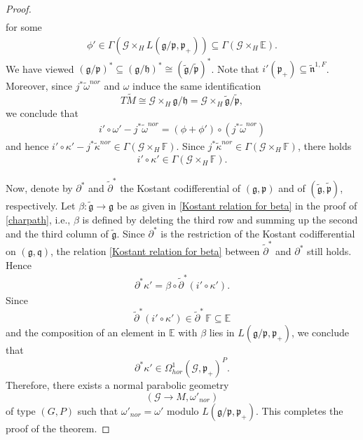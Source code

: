 \documentclass[11pt]{amsart}
\begin{document}
\begin{proof}
\begin{align*}
\end{align*}
for some
\begin{align*}
    \phi'\in\Gamma(\mathcal G\times_HL(\mathfrak g/\mathfrak p,\mathfrak p_+))\subseteq\Gamma(\mathcal G\times_H\mathbb E).
\end{align*}
We have viewed $(\mathfrak g/\mathfrak p)^*\subseteq(\mathfrak g/\mathfrak h)^*\cong(\tilde{\mathfrak g}/\tilde{\mathfrak p})^*$. Note that $i'(\mathfrak p_+)\subseteq\tilde{\mathfrak n}^{1,F}$. Moreover, since $j^*\tilde\omega^{nor}$ and $\omega$ induce the same identification
\[T\tilde M\cong\mathcal G\times_H\mathfrak g/\mathfrak h=\mathcal G\times_H\tilde{\mathfrak g}/\tilde{\mathfrak p},\]
we conclude that
\begin{align*}
    i'\circ\omega'-j^*\tilde\omega^{nor}=(\phi+\phi')\circ(j^*\tilde\omega^{nor})
\end{align*}
and hence $i'\circ\kappa'-j^*\tilde\kappa^{nor}\in\Gamma(\mathcal G\times_H\mathbb F)$. Since $j^*\tilde\kappa^{nor}\in\Gamma(\mathcal G\times_H\mathbb F)$, there holds
\begin{align*}
    i'\circ\kappa'\in\Gamma(\mathcal G\times_H\mathbb F).
    \end{align*}

Now, denote by $\partial^*$ and $\tilde\partial^*$ the Kostant codifferential of $(\mathfrak g,\mathfrak p)$ and of $(\tilde{\mathfrak g},\tilde{\mathfrak p})$, respectively. Let $\beta:\tilde{\mathfrak g}\to\mathfrak g$ be as given in \eqref{Kostant relation for beta} in the proof of \cref{charpath}, i.e., $\beta$ is defined by deleting the third row and summing up the second and the third column of $\tilde{\mathfrak g}$. Since $\partial^*$ is the restriction of the Kostant codifferential on $(\mathfrak g,\mathfrak q)$, the relation \eqref{Kostant relation for beta} between $\tilde\partial^*$ and $\partial^*$ still holds. Hence
\begin{align*}
    \partial^*\kappa'=\beta\circ\tilde{\partial}^*(i'\circ\kappa').
\end{align*}
Since
\[\tilde{\partial}^*(i'\circ\kappa')\in\tilde{\partial}^*\,\mathbb F\subseteq\mathbb E\]
and the composition of an element in $\mathbb E$ with $\beta$ lies in $L(\mathfrak g/\mathfrak p,\mathfrak p_+)$, we conclude that
\[\partial^*\kappa'\in\Omega^1_{hor}(\mathcal G,\mathfrak p_+)^P.\]
Therefore, there exists a normal parabolic geometry
\[(\mathcal G\to M,\omega'_{nor})\]
of type $(G,P)$
such that $\omega'_{nor}=\omega'$ modulo $L(\mathfrak g/\mathfrak p,\mathfrak p_+)$. This completes the proof of the theorem.
\end{proof}
\end{document}
